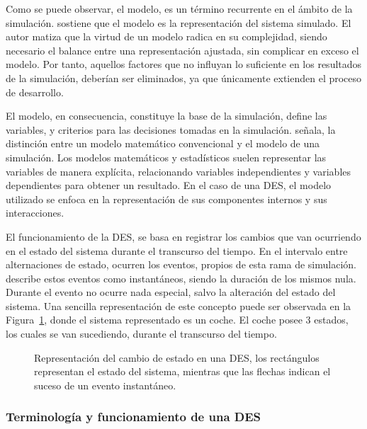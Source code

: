 Como se puede observar, el modelo,
es un término recurrente en el ámbito de la simulación.
\citet{banks1998handbook} sostiene que el modelo es la representación
del sistema simulado.
El autor matiza que la virtud de un modelo radica en su complejidad,
siendo necesario el balance entre una representación ajustada,
sin complicar en exceso el modelo.
Por tanto, aquellos factores que no influyan lo suficiente
en los resultados de la simulación, deberían ser eliminados,
ya que únicamente extienden el proceso de desarrollo.

El modelo, en consecuencia, constituye la base de la simulación,
define las variables, y criterios para las decisiones tomadas en la simulación.
\citet{banks1998handbook} señala,
la distinción entre un modelo matemático convencional
y el modelo de una simulación.
Los modelos matemáticos y estadísticos
suelen representar las variables de manera explícita,
relacionando variables independientes y variables dependientes
para obtener un resultado.
En el caso de una DES, el modelo utilizado se enfoca en
la representación de sus componentes internos y sus interacciones.

El funcionamiento de la DES, se basa en registrar los cambios
que van ocurriendo en el estado del sistema durante el transcurso del tiempo.
En el intervalo entre alternaciones de estado,
ocurren los eventos, propios de esta rama de simulación.
\citet{varga2001discrete} describe estos eventos como instantáneos,
siendo la duración de los mismos nula.
Durante el evento no ocurre nada especial,
salvo la alteración del estado del sistema.
Una sencilla representación de este concepto
puede ser observada en la Figura~\ref{fig:2_fc_simple_ex},
donde el sistema representado es un coche.
El coche posee 3 estados, los cuales se van sucediendo,
durante el transcurso del tiempo.

\begin{figure}[h]
	\begin{center}
		
	\end{center}
	\caption{Representación del cambio de estado en una DES,
	los rectángulos representan el estado del sistema,
	mientras que las flechas indican el suceso de un evento instantáneo.}
	\label{fig:2_fc_simple_ex}
\end{figure}

\subsubsection{Terminología y funcionamiento de una DES}\label{TF_DES}

